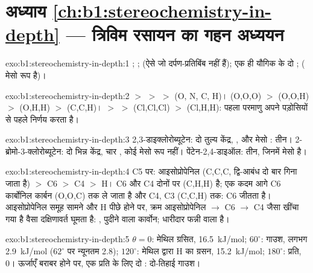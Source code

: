 \section*{अध्याय \ref{ch:b1:stereochemistry-in-depth} --- त्रिविम रसायन का गहन अध्ययन}

\begin{solution}{exo:b1:stereochemistry-in-depth:1}
; ;  (ऐसे  जो
दर्पण-प्रतिबिंब नहीं हैं); एक ही यौगिक के दो ; 
( मेसो रूप है)।
\end{solution}

\begin{solution}{exo:b1:stereochemistry-in-depth:2}
 $>$  $>$  $>$  (O, N, C, H)।
 (O,O,O) $>$  (O,O,H) $>$  (O,H,H) $>$
 (C,C,H)।  $>$  $>$  (Cl,Cl,Cl)
$>$  (Cl,H,H): पहला परमाणु अपने पड़ोसियों से पहले निर्णय करता है।
\end{solution}

\begin{solution}{exo:b1:stereochemistry-in-depth:3}
2,3-डाइक्लोरोब्यूटेन: दो तुल्य केंद्र, ,  और
मेसो : तीन। 2-ब्रोमो-3-क्लोरोब्यूटेन: दो भिन्न केंद्र,
चार , कोई मेसो रूप नहीं। पेंटेन-2,4-डाइऑल: तीन, जिनमें 
मेसो है।
\end{solution}

\begin{solution}{exo:b1:stereochemistry-in-depth:4}
C5 पर: आइसोप्रोपेनिल (C,C,C, द्वि-आबंध दो बार गिना जाता है) $>$ C6 $>$ C4
$>$ H। C6 और C4 दोनों पर (C,H,H) है; एक कदम आगे C6
कार्बोनिल कार्बन (O,O,C) तक ले जाता है और C4, C3 (C,C,H) तक: C6 जीतता है। आइसोप्रोपेनिल
समूह सामने और H पीछे होने पर, क्रम आइसोप्रोपेनिल $\to$ C6 $\to$ C4
जैसा खींचा गया है वैसा दक्षिणावर्त घूमता है: , पुदीने वाला कार्वोन; धारीदार फन्नी वाला
 है।
\end{solution}

\begin{solution}{exo:b1:stereochemistry-in-depth:5}
$\theta = 0$: मेथिल ग्रसित, \qty{16.5}{kJ/mol}; $60^\circ$: गाउश, लगभग
\qty{2.9}{kJ/mol} ($62^\circ$ पर न्यूनतम 2.8); $120^\circ$: मेथिल द्वारा H का ग्रसन,
\qty{15.2}{kJ/mol}; $180^\circ$: प्रति, 0। ऊर्जाएँ बराबर होने पर, एक प्रति के लिए दो : दो-तिहाई गाउश।
\end{solution}


